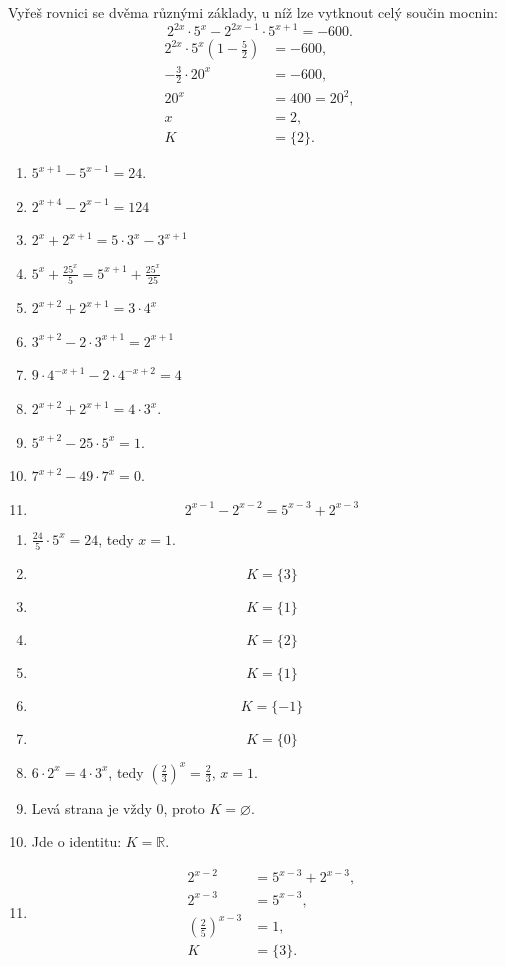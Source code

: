 \documentclass[11pt,a4paper]{article}
\begin{document}
\begin{prikladReseniBox}[title={Příklad 8}]
Vyřeš rovnici se dvěma různými základy, u níž lze vytknout celý součin mocnin:
\[
2^{2x}\cdot5^x-2^{2x-1}\cdot5^{x+1}=-600.
\]
\tcblower
\[
\begin{aligned}
2^{2x}\cdot5^x\left(1-\frac{5}{2}\right)&=-600,\\
-\frac{3}{2}\cdot20^x&=-600,\\
20^x&=400=20^2,\\
x&=2,\\K&=\{2\}.
\end{aligned}
\]
\end{prikladReseniBox}

\begin{zadaniReseniBox}[title={Samostatná práce 1}]
\begin{enumerate}[label=\alph*)]
\item $5^{x+1}-5^{x-1}=24$.
\item $2^{x+4}-2^{x-1}=124$
\item $2^x+2^{x+1}=5\cdot3^x-3^{x+1}$
\item $5^x+\frac{25^x}{5}=5^{x+1}+\frac{25^x}{25}$
\item $2^{x+2}+2^{x+1}=3\cdot4^x$
\item $3^{x+2}-2\cdot3^{x+1}=2^{x+1}$
\item $9\cdot4^{-x+1}-2\cdot4^{-x+2}=4$
\item $2^{x+2}+2^{x+1}=4\cdot3^x$.
\item $5^{x+2}-25\cdot5^x=1$.
\item $7^{x+2}-49\cdot7^x=0$.
\item \[ \displaystyle 2^{x-1}-2^{x-2}=5^{x-3}+2^{x-3} \]
\end{enumerate}
\tcblower
\begin{enumerate}[label=\alph*)]
\item $\frac{24}{5}\cdot5^x=24$, tedy $x=1$.
\item \[K=\{3\}\]
\item \[K=\{1\}\]
\item \[K=\{2\}\]
\item \[K=\{1\}\]
\item \[K=\{-1\}\]
\item \[K=\{0\}\]
\item $6\cdot2^x=4\cdot3^x$, tedy $\left(\frac{2}{3}\right)^x=\frac{2}{3}$, $x=1$.
\item Levá strana je vždy 0, proto $K=\varnothing$.
\item Jde o identitu: $K=\mathbb R$.
\item \[\begin{aligned}2^{x-2}&=5^{x-3}+2^{x-3},\\2^{x-3}&=5^{x-3},\\\left(\frac{2}{5}\right)^{x-3}&=1,\\K&=\{3\}.\end{aligned}\]
\end{enumerate}
\end{zadaniReseniBox}
\end{document}
